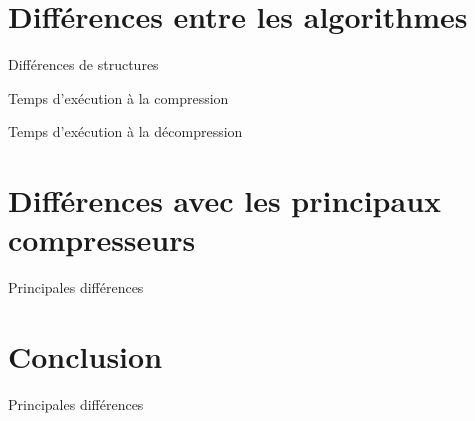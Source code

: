 \documentclass[french]{beamer}
\begin{document}
\section{Différences entre les algorithmes}
\begin{frame}{Différences de structures}
	\begin{center}
	\end{center}
\end{frame}
\begin{frame}{Temps d'exécution à la compression} 
	\begin{center}
	\end{center}
\end{frame}
\begin{frame}{Temps d'exécution à la décompression}
	\begin{center}
	\end{center}
\end{frame}

\section{Différences avec les principaux compresseurs}
\begin{frame}{Principales différences}
	\begin{center}
	\end{center}
\end{frame}

\section{Conclusion}
\begin{frame}{Principales différences}
	\begin{center}
	\end{center}
\end{frame}
\end{document}
